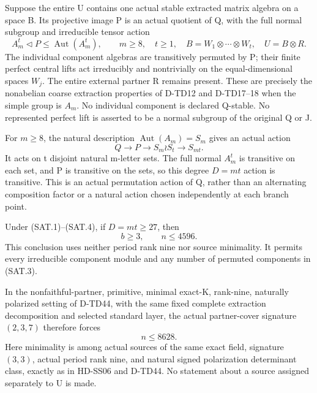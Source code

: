 Suppose the entire U contains one actual stable extracted matrix
algebra on a space B. Its projective image P is an actual quotient
of Q, with the full normal subgroup and irreducible tensor action
\[
 A_m^t\triangleleft P\le\operatorname{Aut}(A_m^t),\qquad
 m\ge8,\quad t\ge1,\quad
 B=W_1\otimes\cdots\otimes W_t,\quad
 U=B\otimes R.
 \tag{SAT.3}
\]
The individual component algebras are transitively permuted by P;
their finite perfect central lifts act irreducibly and nontrivially
on the equal-dimensional spaces \(W_j\). The entire external
partner R remains present. These are precisely the nonabelian
coarse extraction properties of D-TD12 and D-TD17--18 when the
simple group is \(A_m\). No individual component is declared
Q-stable. No represented perfect lift is asserted to be a normal
subgroup of the original Q or J.

For \(m\ge8\), the natural description
\(\operatorname{Aut}(A_m)=S_m\) gives an actual action
\[
 Q\longrightarrow P\longrightarrow S_m\wr S_t
       \longrightarrow S_{mt}.
 \tag{SAT.4}
\]
It acts on t disjoint natural m-letter sets. The full normal
\(A_m^t\) is transitive on each set, and P is transitive on the
sets, so this degree \(D=mt\) action is transitive. This is an
actual permutation action of Q, rather than an alternating
composition factor or a natural action chosen independently at
each branch point.

\begin{theorem}[D-TD46]
Under (SAT.1)--(SAT.4), if \(D=mt\ge27\), then
\[
                  b\ge3,\qquad n\le4596.
 \tag{SAT.5}
\]
This conclusion uses neither period rank nine nor source minimality.
It permits every irreducible component module and any number of
permuted components in (SAT.3).

In the nonfaithful-partner, primitive, minimal exact-K, rank-nine,
naturally polarized setting of D-TD44, with the same fixed complete
extraction decomposition and
selected standard layer, the actual partner-cover signature
\((2,3,7)\) therefore forces
\[
                              n\le8628.
 \tag{SAT.6}
\]
Here minimality is among actual sources of the same exact field,
signature \((3,3)\), actual period rank nine, and natural signed
polarization determinant class, exactly as in HD-SS06 and D-TD44.
No statement about a source assigned separately to U is made.
\end{theorem}

